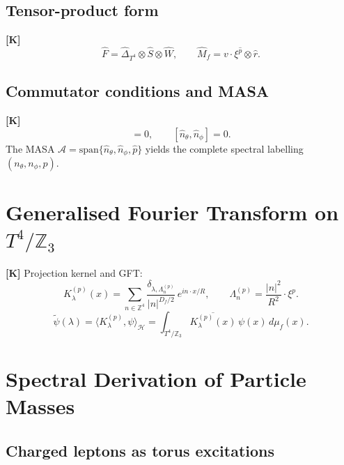 \subsection{Tensor-product form}

\textbf{[K]}
\begin{equation}
  \hat{F} = \hat{\Delta}_{T^4} \otimes \hat{S} \otimes \hat{W},
  \qquad
  \hat{M}_f = v\cdot\xi^{\hat{p}} \otimes \hat{r}.
\end{equation}

\subsection{Commutator conditions and MASA}

\textbf{[K]}
\begin{equation}
  [\hat{F}, \hat{S}] = 0,\qquad
  [\hat{n}_\theta, \hat{n}_\phi] = 0.
\end{equation}
The MASA $\mathcal{A} = \mathrm{span}\{\hat{n}_\theta, \hat{n}_\phi,
\hat{p}\}$ yields the complete spectral labelling $(n_\theta, n_\phi, p)$.

\section{Generalised Fourier Transform on $T^4/\mathbb{Z}_3$}

\textbf{[K]} Projection kernel and GFT:
\begin{equation}
  K_\lambda^{(p)}(x) = \sum_{n\in\mathbb{Z}^4}
  \frac{\delta_{\lambda,\Lambda_n^{(p)}}}{|n|^{D_f/2}}\,e^{in\cdot x/R},
  \qquad
  \Lambda_n^{(p)} = \frac{|n|^2}{R^2}\cdot\xi^p.
\end{equation}
\begin{equation}
  \tilde{\psi}(\lambda) = \langle K_\lambda^{(p)}, \psi\rangle_{\mathcal{H}}
  = \int_{T^4/\mathbb{Z}_3}
  \overline{K_\lambda^{(p)}(x)}\,\psi(x)\,d\mu_f(x).
\end{equation}

\section{Spectral Derivation of Particle Masses}
\label{sec:masses}

\subsection{Charged leptons as torus excitations}

